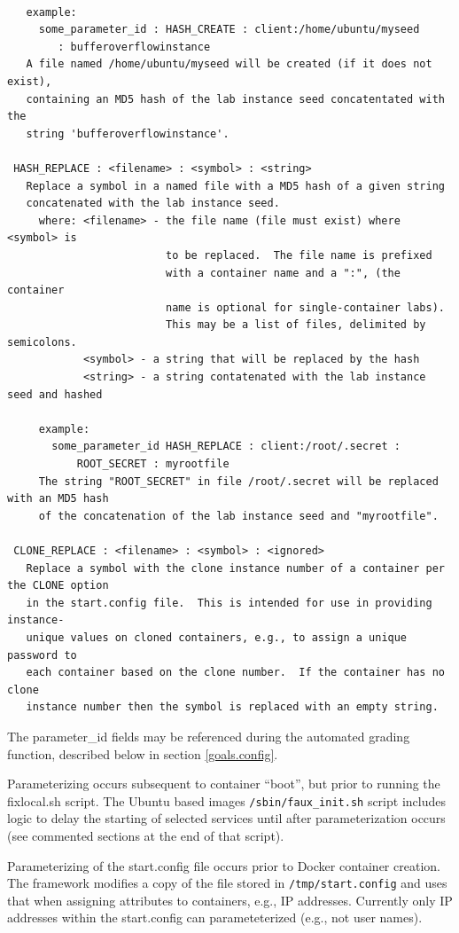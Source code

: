 \documentclass[12pt]{article}
\begin{document}
\begin{verbatim}
                   
   example:
     some_parameter_id : HASH_CREATE : client:/home/ubuntu/myseed 
        : bufferoverflowinstance
   A file named /home/ubuntu/myseed will be created (if it does not exist), 
   containing an MD5 hash of the lab instance seed concatentated with the 
   string 'bufferoverflowinstance'.
 
 HASH_REPLACE : <filename> : <symbol> : <string>
   Replace a symbol in a named file with a MD5 hash of a given string 
   concatenated with the lab instance seed.
     where: <filename> - the file name (file must exist) where <symbol> is 
                         to be replaced.  The file name is prefixed 
                         with a container name and a ":", (the container 
                         name is optional for single-container labs).  
                         This may be a list of files, delimited by semicolons. 
            <symbol> - a string that will be replaced by the hash
            <string> - a string contatenated with the lab instance seed and hashed

     example:
       some_parameter_id HASH_REPLACE : client:/root/.secret : 
           ROOT_SECRET : myrootfile
     The string "ROOT_SECRET" in file /root/.secret will be replaced with an MD5 hash
     of the concatenation of the lab instance seed and "myrootfile".

 CLONE_REPLACE : <filename> : <symbol> : <ignored>
   Replace a symbol with the clone instance number of a container per the CLONE option
   in the start.config file.  This is intended for use in providing instance-
   unique values on cloned containers, e.g., to assign a unique password to
   each container based on the clone number.  If the container has no clone
   instance number then the symbol is replaced with an empty string.
\end{verbatim}

The parameter\_id fields may be referenced during the automated grading function, described below
in section \ref{goals.config}. 

Parameterizing occurs subsequent to container ``boot'', but prior to running the fixlocal.sh script.
The Ubuntu based images {\tt /sbin/faux\_init.sh}  script includes logic to delay the starting of 
selected services until after parameterization occurs (see commented sections at the end of that script).

Parameterizing of the start.config file occurs prior to Docker container creation.  The framework 
modifies a copy of the file stored in {\tt /tmp/start.config} and uses that when assigning attributes to containers,
e.g., IP addresses. Currently only IP addresses within the start.config can parameteterized (e.g., not user names).
\end{document}
